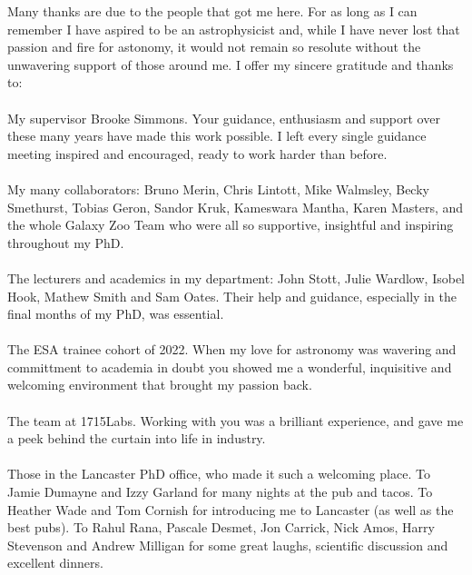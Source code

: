 

\begin{acknowledgements}      %
Many thanks are due to the people that got me here. For as long as I can remember I have aspired to be an astrophysicist and, while I have never lost that passion and fire for astonomy, it would not remain so resolute without the unwavering support of those around me. I offer my sincere gratitude and thanks to:
\\
\\
My supervisor Brooke Simmons. Your guidance, enthusiasm and support over these many years have made this work possible. I left every single guidance meeting inspired and encouraged, ready to work harder than before.
\\
\\
My many collaborators: Bruno Merin, Chris Lintott, Mike Walmsley, Becky Smethurst, Tobias Geron, Sandor Kruk, Kameswara Mantha, Karen Masters, and the whole Galaxy Zoo Team who were all so supportive, insightful and inspiring throughout my PhD. 
\\
\\
The lecturers and academics in my department: John Stott, Julie Wardlow, Isobel Hook, Mathew Smith and Sam Oates. Their help and guidance, especially in the final months of my PhD, was essential.
\\
\\
The ESA trainee cohort of 2022. When my love for astronomy was wavering and committment to academia in doubt you showed me a wonderful, inquisitive and welcoming environment that brought my passion back.
\\
\\
The team at 1715Labs. Working with you was a brilliant experience, and gave me a peek behind the curtain into life in industry.
\\
\\
Those in the Lancaster PhD office, who made it such a welcoming place. To Jamie Dumayne and Izzy Garland for many nights at the pub and tacos. To Heather Wade and Tom Cornish for introducing me to Lancaster (as well as the best pubs). To Rahul Rana, Pascale Desmet, Jon Carrick, Nick Amos, Harry Stevenson and Andrew Milligan for some great laughs, scientific discussion and excellent dinners.

\end{acknowledgements}
